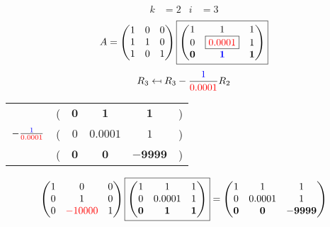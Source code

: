 \documentclass[pdf]{beamer}
\begin{document}
\begin{frame}{}\begin{align*} k &= 2 & i &= 3 \end{align*} $$A=\begin{pmatrix}1&0&0\\1&1&0\\1&0&1\end{pmatrix} \boxed{\begin{pmatrix}1&1&1\\0&\boxed{{\color{red}0.0001}}&1\\\mathbf{0}&\mathbf{{\color{blue}1}}&\mathbf{1}\end{pmatrix}} $$ $$R_3 \mapsfrom R_3 - \frac{{\color{blue}1}}{{\color{red}0.0001}} R_2$$ \begin{center}\begin{tabular}{cccccc}  &(& $ \mathbf{0} $ & $ \mathbf{1} $ & $ \mathbf{1} $ &)\\$ -\frac{{\color{blue}1}}{{\color{red}0.0001}} $&(& $ 0 $ & $ 0.0001 $ & $ 1 $ &)\\\hline  &(& $ \mathbf{0} $ & $ \mathbf{0} $ & $ \mathbf{-9999} $ &) \end{tabular}\end{center} $$ \begin{pmatrix}1&0&0\\0&1&0\\0&{\color{red}-10000}&1\end{pmatrix} \boxed{\begin{pmatrix}1&1&1\\0&0.0001&1\\\mathbf{0}&\mathbf{1}&\mathbf{1}\end{pmatrix}} = \begin{pmatrix}1&1&1\\0&0.0001&1\\\mathbf{0}&\mathbf{0}&\mathbf{-9999}\end{pmatrix} $$\end{frame}
\end{document}
